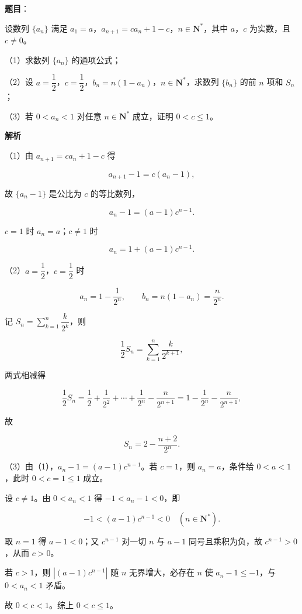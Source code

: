 \begin{answer}

\textbf{题目}：

设数列 $\{a_n\}$ 满足 $a_1=a$，$a_{n+1}=ca_n+1-c$，$n\in\mathbf N^*$，其中 $a$，$c$ 为实数，且 $c\neq0$。

（1）求数列 $\{a_n\}$ 的通项公式；

（2）设 $a=\dfrac12$，$c=\dfrac12$，$b_n=n(1-a_n)$，$n\in\mathbf N^*$，求数列 $\{b_n\}$ 的前 $n$ 项和 $S_n$；

（3）若 $0<a_n<1$ 对任意 $n\in\mathbf N^*$ 成立，证明 $0<c\leqslant1$。

\textbf{解析}

（1）由 $a_{n+1}=ca_n+1-c$ 得

\nopagebreak[4]
\[a_{n+1}-1=c(a_n-1),\]

故 $\{a_n-1\}$ 是公比为 $c$ 的等比数列，

\nopagebreak[4]
\[a_n-1=(a-1)c^{n-1}.\]

$c=1$ 时 $a_n=a$；$c\neq1$ 时

\nopagebreak[4]
\[a_n=1+(a-1)c^{n-1}.\]

（2）$a=\dfrac12$，$c=\dfrac12$ 时

\nopagebreak[4]
\[a_n=1-\frac1{2^n},\qquad b_n=n(1-a_n)=\frac n{2^n}.\]

记 $S_n=\sum\limits_{k=1}^n\dfrac k{2^k}$，则

\nopagebreak[4]
\[\frac12S_n=\sum_{k=1}^n\frac k{2^{k+1}},\]

两式相减得

\nopagebreak[4]
\[\frac12S_n=\frac12+\frac1{2^2}+\cdots+\frac1{2^n}-\frac n{2^{n+1}}=1-\frac1{2^n}-\frac n{2^{n+1}},\]

故

\nopagebreak[4]
\[S_n=2-\frac{n+2}{2^n}.\]

（3）由（1），$a_n-1=(a-1)c^{n-1}$。若 $c=1$，则 $a_n=a$，条件给 $0<a<1$，此时 $0<c=1\leqslant1$ 成立。

设 $c\neq1$。由 $0<a_n<1$ 得 $-1<a_n-1<0$，即

\nopagebreak[4]
\[-1<(a-1)c^{n-1}<0\quad(n\in\mathbf N^*).\]

取 $n=1$ 得 $a-1<0$；又 $c^{n-1}$ 对一切 $n$ 与 $a-1$ 同号且乘积为负，故 $c^{n-1}>0$，从而 $c>0$。

若 $c>1$，则 $\left|(a-1)c^{n-1}\right|$ 随 $n$ 无界增大，必存在 $n$ 使 $a_n-1\leqslant-1$，与 $0<a_n<1$ 矛盾。

故 $0<c<1$。综上 $0<c\leqslant1$。


\end{answer}
